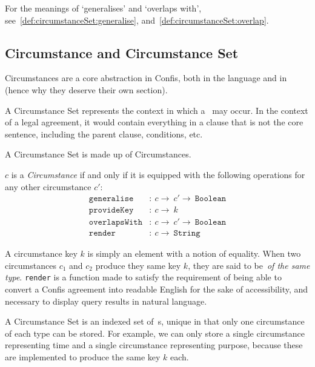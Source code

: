 For the meanings of `generalises' and `overlaps with', see~\autoref{def:circumstanceSet:generalise}, and~\autoref{def:circumstanceSet:overlap}.

\subsection{Circumstance and Circumstance Set}\label{subsec:circumstance}

Circumstances are a core abstraction in Confis, both in the language and in~ (hence why they deserve their own section).

A Circumstance Set represents the context in which a~ may occur.
In the context of a legal agreement, it would contain everything in a clause that is not the core sentence, including the parent clause, conditions, etc.

A Circumstance Set is made up of Circumstances.


\begin{definition}[Circumstance]
    \label{def:circumstance}
    $c$ is a \emph{Circumstance} if and only if it is equipped with the following operations for any other circumstance $c'$:
    \begin{align}
        \label{def:c:generalise}
        \texttt{generalise}&: \ c \to\ c' \to\ \texttt{Boolean}\\
        \label{def:c:provideKey}
        \texttt{provideKey}&: \ c \to\ k\\
        \label{def:c:overlap}
        \texttt{overlapsWith}&:\ c \to\ c' \to\ \texttt{Boolean}\\
        \label{def:c:render}
        \texttt{render}&: \ c \to\ \texttt{String}
    \end{align}
\end{definition}

A circumstance key $k$ is simply an element with a notion of equality.
When two circumstances $c_1$ and $c_2$ produce they same key $k$, they are said to be~\emph{of the same type}.
\texttt{render} is a function made to satisfy the requirement of being able to convert a Confis agreement into readable English for the sake of accessibility, and necessary to display query results in natural language.

A Circumstance Set is an indexed set of~s, unique in that only one circumstance of each type can be stored.
For example, we can only store a single circumstance representing time and a single circumstance representing purpose, because these are implemented to produce the same key $k$ each.

